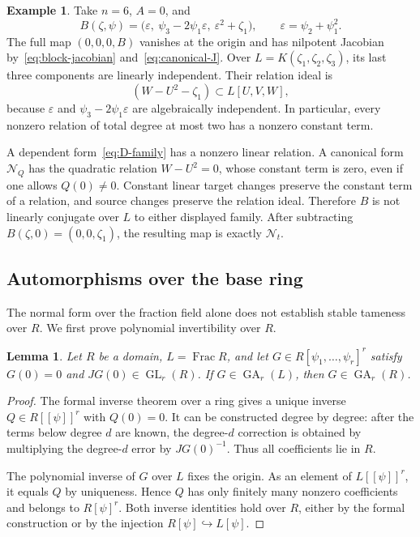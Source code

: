 \documentclass[11pt,reqno]{amsart}
\newtheorem{lemma}[theorem]{Lemma}
\theoremstyle{definition}
\newtheorem{example}[theorem]{Example}
\theoremstyle{remark}
\numberwithin{equation}{section}
\DeclareMathOperator{\GL}{GL}
\DeclareMathOperator{\GA}{GA}
\DeclareMathOperator{\Frac}{Frac}
\newcommand{\Ncal}{\mathcal N}
\begin{document}
\begin{example}\label{ex:fiber-constant}
Take $n=6$, $A=0$, and
\[
 B(\zeta,\psi)=\bigl(\varepsilon,\ \psi_3-2\psi_1\varepsilon,\ \varepsilon^2+\zeta_1\bigr),\qquad \varepsilon=\psi_2+\psi_1^2.
\]
The full map $(0,0,0,B)$ vanishes at the origin and has nilpotent Jacobian by~\eqref{eq:block-jacobian} and~\eqref{eq:canonical-J}. Over $L=K(\zeta_1,\zeta_2,\zeta_3)$, its last three components are linearly independent. Their relation ideal is
\[
 (W-U^2-\zeta_1)\subset L[U,V,W],
\]
because $\varepsilon$ and $\psi_3-2\psi_1\varepsilon$ are algebraically independent. In particular, every nonzero relation of total degree at most two has a nonzero constant term.

A dependent form~\eqref{eq:D-family} has a nonzero linear relation. A canonical form $\Ncal_Q$ has the quadratic relation $W-U^2=0$, whose constant term is zero, even if one allows $Q(0)\neq0$. Constant linear target changes preserve the constant term of a relation, and source changes preserve the relation ideal. Therefore $B$ is not linearly conjugate over $L$ to either displayed family. After subtracting $B(\zeta,0)=(0,0,\zeta_1)$, the resulting map is exactly $\Ncal_t$.
\end{example}

\subsection{Automorphisms over the base ring}
The normal form over the fraction field alone does not establish stable tameness over $R$. We first prove polynomial invertibility over $R$.

\begin{lemma}\label{lem:inverse-descent}
Let $R$ be a domain, $L=\Frac R$, and let $G\in R[\psi_1,\ldots,\psi_r]^r$ satisfy $G(0)=0$ and $JG(0)\in\GL_r(R)$. If $G\in\GA_r(L)$, then $G\in\GA_r(R)$.
\end{lemma}

\begin{proof}
The formal inverse theorem over a ring gives a unique inverse $Q\in R[[\psi]]^r$ with $Q(0)=0$. It can be constructed degree by degree: after the terms below degree $d$ are known, the degree-$d$ correction is obtained by multiplying the degree-$d$ error by $JG(0)^{-1}$. Thus all coefficients lie in $R$.

The polynomial inverse of $G$ over $L$ fixes the origin. As an element of $L[[\psi]]^r$, it equals $Q$ by uniqueness. Hence $Q$ has only finitely many nonzero coefficients and belongs to $R[\psi]^r$. Both inverse identities hold over $R$, either by the formal construction or by the injection $R[\psi]\hookrightarrow L[\psi]$.
\end{proof}
\end{document}
